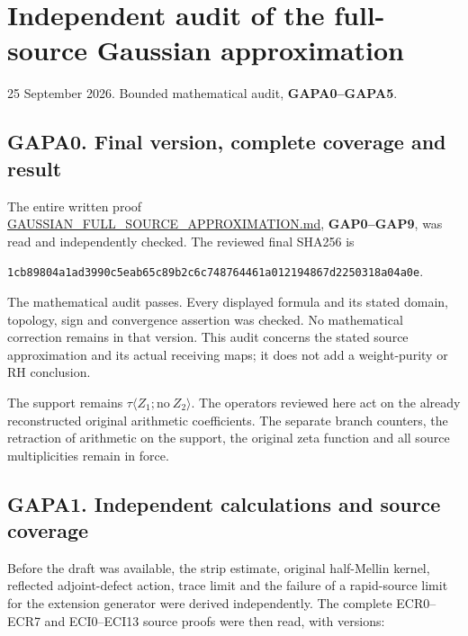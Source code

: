 \section{Independent audit of the full-source Gaussian
approximation}\label{independent-audit-of-the-full-source-gaussian-approximation}

25 September 2026. Bounded mathematical audit, \textbf{GAPA0--GAPA5}.

\subsection{GAPA0. Final version, complete coverage and
result}\label{gapa0.-final-version-complete-coverage-and-result}

The entire written proof
\href{https://github.com/KokunoYumeto/zeta-function-research-reader/blob/main/workbenches/splitzero-tandem/continuations/20260925-full-source-tensor-and-original-divisor/identity/GAUSSIAN_FULL_SOURCE_APPROXIMATION.md}{GAUSSIAN\_FULL\_SOURCE\_APPROXIMATION.md},
\textbf{GAP0--GAP9}, was read and independently checked. The reviewed
final SHA256 is

\texttt{1cb89804a1ad3990c5eab65c89b2c6c748764461a012194867d2250318a04a0e}.

The mathematical audit passes. Every displayed formula and its stated
domain, topology, sign and convergence assertion was checked. No
mathematical correction remains in that version. This audit concerns the
stated source approximation and its actual receiving maps; it does not
add a weight-purity or RH conclusion.

The support remains \(\tau\langle Z_1;\mathrm{no}\ Z_2\rangle\). The
operators reviewed here act on the already reconstructed original
arithmetic coefficients. The separate branch counters, the retraction of
arithmetic on the support, the original zeta function and all source
multiplicities remain in force.

\subsection{GAPA1. Independent calculations and source
coverage}\label{gapa1.-independent-calculations-and-source-coverage}

Before the draft was available, the strip estimate, original half-Mellin
kernel, reflected adjoint-defect action, trace limit and the failure of
a rapid-source limit for the extension generator were derived
independently. The complete ECR0--ECR7 and ECI0--ECI13 source proofs
were then read, with versions:

